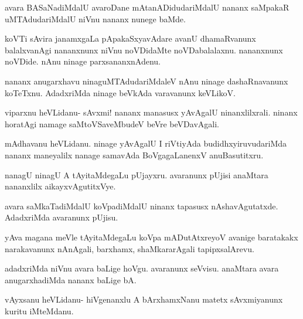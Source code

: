 \documentclass{article}
\begin{document}
\begin{mng}%
avara BASaNadiMdalU avaroDane mAtanADidudariMdalU
nananx saMpakaR uMTAdudariMdalU niVnu nananx nunege baMde.
\end{mng}

\begin{mng}%
koVTi sAvira janamxgaLa pApakaSxyavAdare avanU dhamaRvanunx
balalxvanAgi nananxnunx niVnu noVDidaMte noVDabalalaxnu. nananxnunx noVDide.
nAnu ninage parxsananxnAdenu.
\end{mng}

\begin{mng}%
nananx anugarxhavu ninaguMTAdudariMdaleV nAnu ninage dashaRnavanunx
koTeTxnu. AdadxriMda ninage beVkAda varavanunx keVLikoV.
\end{mng}

\begin{mng}%
viparxnu heVLidanu- sAvxmi! nananx manasusx yAvAgalU 
ninanxlilxrali. ninanx horatAgi namage saMtoVSaveMbudeV beVre beVDavAgali.
\end{mng}

\begin{mng}%
mAdhavanu heVLidanu. ninage yAvAgalU I riVtiyAda
budidhxyiruvudariMda nananx maneyalilx nanage samavAda BoVgagaLanenxV anuBasutitxru.
\end{mng}

\begin{mng}%
nanagU ninagU A tAyitaMdegaLu pUjayxru. avaranunx
pUjisi anaMtara nananxlilx aikayxvAgutitxVye.
\end{mng}

\begin{mng}%
avara saMkaTadiMdalU koVpadiMdalU ninanx tapasusx nAshavAgutatxde.
AdadxriMda avaranunx pUjisu.
\end{mng}

\begin{mng}%
yAva magana meVle tAyitaMdegaLu koVpa mADutAtxreyoV
avanige baratakakx narakavanunx nAnAgali, barxhamx, shaMkararAgali tapipxsalArevu.
\end{mng}

\begin{mng}%
adadxriMda niVnu avara baLige hoVgu. avaranunx seVvisu.
anaMtara avara anugarxhadiMda nananx baLige bA.
\end{mng}

\begin{mng}%
vAyxsanu heVLidanu- hiVgenanxlu A bArxhamxNanu matetx
sAvxmiyanunx kuritu iMteMdanu.
\end{mng}
\end{document}
